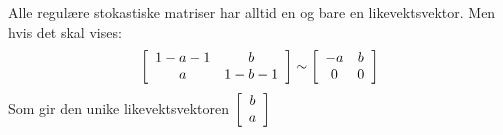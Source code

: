 \documentclass[11pt, a4paper, norsk]{NTNUoving}
\newenvironment{matrise}[1][c]
{
\left[\begin{array}{#1}
}
{    
\end{array}\right]           
}
\begin{document}
\begin{oppgave}
    Alle regulære stokastiske matriser har alltid en og bare en likevektsvektor. Men hvis det skal vises: 
    \begin{align*}
        \begin{matrise}[cc]
            1-a-1 & b\\a & 1-b-1
        \end{matrise} \sim \begin{matrise}[cc]
            -a & b\\0&0
        \end{matrise}
    \end{align*}
    Som gir den unike likevektsvektoren $\begin{matrise}
    b \\ a
    \end{matrise}$
\end{oppgave}
\end{document}

